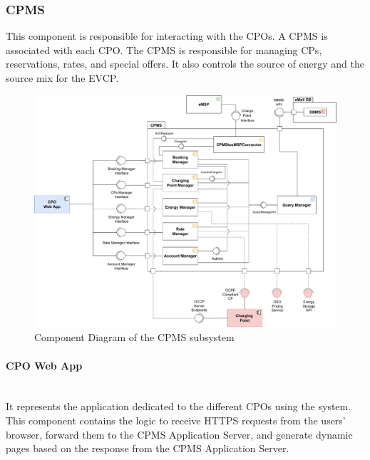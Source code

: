 \pagebreak

\subsubsection{CPMS}
This component is responsible for interacting with the CPOs. A CPMS is associated with each CPO. The CPMS is responsible for managing CPs, reservations, rates, and special offers. It also controls the source of energy and the source mix for the EVCP.
\begin{figure}[H]
    \centering
    \hspace*{-2cm}
    \includegraphics[scale=0.5]{src/ComponentDiagram/cpms_component_diagram.pdf}
    \caption{Component Diagram of the CPMS subsystem}
\end{figure}

\paragraph*{CPO Web App} \hfill \\
It represents the application dedicated to the different CPOs using the system. This component contains the logic to receive HTTPS requests from the users' browser,
forward them to the CPMS Application Server, and generate dynamic pages based on the response from the CPMS Application Server.

